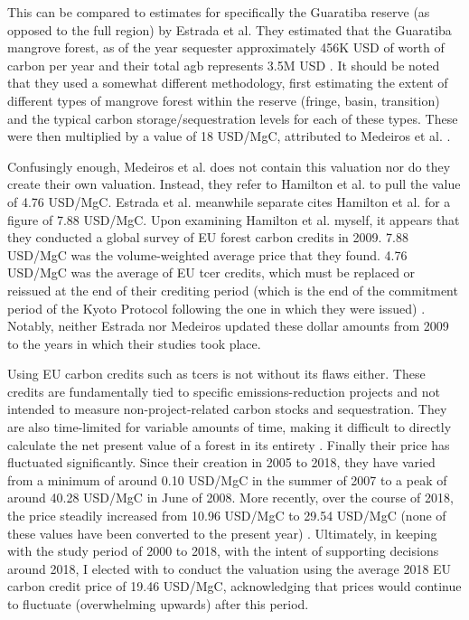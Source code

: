 This can be compared to estimates for specifically the Guaratiba reserve (as opposed to the full region) by Estrada et al. They estimated that the Guaratiba mangrove forest, as of the year  sequester approximately 456K USD of worth of carbon per year and their total \ac{agb} represents 3.5M USD \cite{estradaEconomicEvaluationCarbon2015}. It should be noted that they used a somewhat different methodology, first estimating the extent of different types of mangrove forest within the reserve (fringe, basin, transition) and the typical carbon storage/sequestration levels for each of these types. These were then multiplied by a value of 18 USD/MgC, attributed to Medeiros et al. \cite{medeirosContribuicaoUnidadesConservacao2011}. 

Confusingly enough, Medeiros et al. does not contain this valuation nor do they create their own valuation. Instead, they refer to Hamilton et al. \cite{hamiltonStateForestCarbon2010} to pull the value of 4.76 USD/MgC. Estrada et al. meanwhile separate cites Hamilton et al. for a figure of 7.88 USD/MgC. Upon examining Hamilton et al. myself, it appears that they conducted a global survey of EU forest carbon credits in 2009. 7.88 USD/MgC was the volume-weighted average price that they found. 4.76 USD/MgC was the average of EU \ac{tcer} credits, which must be replaced or reissued at the end of their crediting period (which is the end of the commitment period of the Kyoto Protocol following the one in which they were issued) \cite{salinasNonpermanence2011}. Notably, neither Estrada nor Medeiros updated these dollar amounts from 2009 to the years in which their studies took place. 

Using EU carbon credits such as \acp{tcer} is not without its flaws either. These credits are fundamentally tied to specific emissions-reduction projects and not intended to measure non-project-related carbon stocks and sequestration. They are also time-limited for variable amounts of time, making it difficult to directly calculate the net present value of a forest in its entirety \cite{salinasNonpermanence2011}. Finally their price has fluctuated significantly. Since their creation in 2005 to 2018, they have varied from a minimum of around 0.10 USD/MgC in the summer of 2007 to a peak of around 40.28 USD/MgC in June of 2008. More recently, over the course of 2018, the price steadily increased from 10.96 USD/MgC to 29.54 USD/MgC (none of these values have been converted to the present year) \cite{EUCarbonPermits2023}. Ultimately, in keeping with the study period of 2000 to 2018, with the intent of supporting decisions around 2018, I elected with to conduct the valuation using the average 2018 EU carbon credit price of 19.46 USD/MgC, acknowledging that prices would continue to fluctuate (overwhelming upwards) after this period. 

